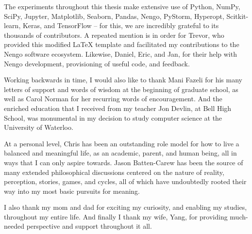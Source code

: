 \newpage

The experiments throughout this thesis make extensive use of Python, NumPy, SciPy, Jupyter, Matplotlib, Seaborn, Pandas, Nengo, PyStorm, Hyperopt, Scitkit-learn, Keras, and TensorFlow -- for this, we are incredibly grateful to its thousands of contributors.
A repeated mention is in order for Trevor, who provided this modified \LaTeX{} template and facilitated my contributions to the Nengo software ecosystem.
Likewise, Daniel, Eric, and Jan, for their help with Nengo development, provisioning of useful code, and feedback.

Working backwards in time, I would also like to thank Mani Fazeli for his many letters of support and words of wisdom at the beginning of graduate school, as well as Carol Norman for her recurring words of encouragement.
And the enriched education that I received from my teacher Jon Devlin, at Bell High School, was monumental in my decision to study computer science at the University of Waterloo.

At a personal level, Chris has been an outstanding role model for how to live a balanced and meaningful life, as an academic, parent, and human being, all in ways that I can only aspire towards.
Jason Batten-Carew has been the source of many extended philosophical discussions centered on the nature of reality, perception, stories, games, and cycles, all of which have undoubtedly rooted their way into my most basic pursuits for meaning.

I also thank my mom and dad for exciting my curiosity, and enabling my studies, throughout my entire life.
And finally I thank my wife, Yang, for providing much-needed perspective and support throughout it all.

\cleardoublepage
